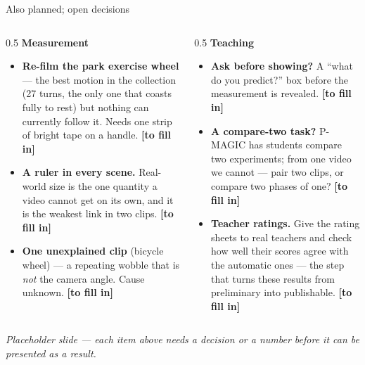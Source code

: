 \documentclass[aspectratio=169,10pt]{beamer}
\newcommand{\todo}{{\scriptsize\color{cAccent}\textbf{[to fill in]}}}
\newcommand{\takeaway}[1]{\vfill{\footnotesize\itshape\color{cGrey}#1\par}}
\begin{document}
\begin{frame}{Also planned; open decisions}
\small
\begin{columns}[T]
\begin{column}{0.5\textwidth}
\textbf{\color{cMeas}Measurement}
\begin{itemize}\setlength\itemsep{2pt}
  \item \textbf{Re-film the park exercise wheel} --- the best motion in the collection (27 turns,
        the only one that coasts fully to rest) but nothing can currently follow it. Needs one strip
        of bright tape on a handle. \todo
  \item \textbf{A ruler in every scene.} Real-world size is the one quantity a video cannot get on
        its own, and it is the weakest link in two clips. \todo
  \item \textbf{One unexplained clip} (bicycle wheel) --- a repeating wobble that is \emph{not} the
        camera angle. Cause unknown. \todo
\end{itemize}
\end{column}
\begin{column}{0.5\textwidth}
\textbf{\color{cPed}Teaching}
\begin{itemize}\setlength\itemsep{2pt}
  \item \textbf{Ask before showing?} A ``what do you predict?'' box before the measurement is
        revealed. \todo
  \item \textbf{A compare-two task?} P-MAGIC has students compare two experiments; from one video
        we cannot --- pair two clips, or compare two phases of one? \todo
  \item \textbf{Teacher ratings.} Give the rating sheets to real teachers and check how well their
        scores agree with the automatic ones --- the step that turns these results from preliminary
        into publishable. \todo
\end{itemize}
\end{column}
\end{columns}
\takeaway{Placeholder slide --- each item above needs a decision or a number before it can be
presented as a result.}
\end{frame}
\end{document}
